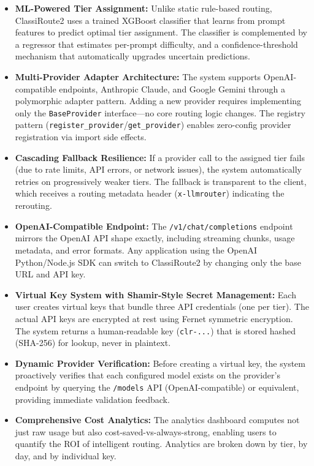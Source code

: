 \documentclass[12pt,a4paper]{report}
\begin{document}
\begin{itemize}[nosep]
    \item \textbf{ML-Powered Tier Assignment:} Unlike static rule-based routing, ClassiRoute2 uses a trained XGBoost classifier that learns from prompt features to predict optimal tier assignment. The classifier is complemented by a regressor that estimates per-prompt difficulty, and a confidence-threshold mechanism that automatically upgrades uncertain predictions.
    \item \textbf{Multi-Provider Adapter Architecture:} The system supports OpenAI-compatible endpoints, Anthropic Claude, and Google Gemini through a polymorphic adapter pattern. Adding a new provider requires implementing only the \texttt{BaseProvider} interface---no core routing logic changes. The registry pattern (\texttt{register\_provider}/\texttt{get\_provider}) enables zero-config provider registration via import side effects.
    \item \textbf{Cascading Fallback Resilience:} If a provider call to the assigned tier fails (due to rate limits, API errors, or network issues), the system automatically retries on progressively weaker tiers. The fallback is transparent to the client, which receives a routing metadata header (\texttt{x-llmrouter}) indicating the rerouting.
    \item \textbf{OpenAI-Compatible Endpoint:} The \texttt{/v1/chat/completions} endpoint mirrors the OpenAI API shape exactly, including streaming chunks, usage metadata, and error formats. Any application using the OpenAI Python/Node.js SDK can switch to ClassiRoute2 by changing only the base URL and API key.
    \item \textbf{Virtual Key System with Shamir-Style Secret Management:} Each user creates virtual keys that bundle three API credentials (one per tier). The actual API keys are encrypted at rest using Fernet symmetric encryption. The system returns a human-readable key (\texttt{clr-...}) that is stored hashed (SHA-256) for lookup, never in plaintext.
    \item \textbf{Dynamic Provider Verification:} Before creating a virtual key, the system proactively verifies that each configured model exists on the provider's endpoint by querying the \texttt{/models} API (OpenAI-compatible) or equivalent, providing immediate validation feedback.
    \item \textbf{Comprehensive Cost Analytics:} The analytics dashboard computes not just raw usage but also cost-saved-vs-always-strong, enabling users to quantify the ROI of intelligent routing. Analytics are broken down by tier, by day, and by individual key.
\end{itemize}
\end{document}
